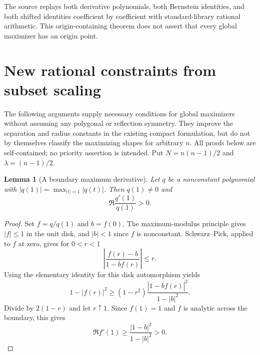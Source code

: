 \documentclass[11pt]{article}
\newtheorem{lemma}[theorem]{Lemma}
\theoremstyle{remark}
\numberwithin{equation}{section}
\begin{document}
The source  replays both derivative
polynomials, both Bernstein identities, and both shifted identities
coefficient by coefficient with standard-library rational arithmetic.
This origin-containing theorem does not assert that every global
maximizer has an origin point.

\section{New rational constraints from subset scaling}
\label{sec:subset-scaling-new}

The following arguments supply necessary conditions for global maximizers
without assuming any polygonal or reflection symmetry. They improve the
separation and radius constants in the existing compact formulation, but
do not by themselves classify the maximizing shapes for arbitrary $n$.
All proofs below are self-contained; no priority assertion is intended.
Put $N=n(n-1)/2$ and $\lambda=(n-1)/2$.

\begin{lemma}[A boundary maximum derivative]\label{lem:boundary-derivative-new}
Let $q$ be a nonconstant polynomial with
$|q(1)|=\max_{|t|=1}|q(t)|$. Then $q(1)\ne0$ and
\[
                 \Re\frac{q'(1)}{q(1)}>0.
\]
\end{lemma}
\begin{proof}
Set $f=q/q(1)$ and $b=f(0)$. The maximum-modulus principle gives
$|f|\le1$ in the unit disk, and $|b|<1$ since $f$ is nonconstant.
Schwarz--Pick, applied to $f$ at zero, gives for $0<r<1$
\[
 \left|\frac{f(r)-b}{1-\overline b f(r)}\right|\le r.
\]
Using the elementary identity for this disk automorphism yields
\[
 1-|f(r)|^2\ge
 (1-r^2)\frac{|1-\overline b f(r)|^2}{1-|b|^2}.
\]
Divide by $2(1-r)$ and let $r\uparrow1$. Since $f(1)=1$ and $f$
is analytic across the boundary, this gives
\[
 \Re f'(1)\ge\frac{|1-b|^2}{1-|b|^2}>0.
\]
\end{proof}
\end{document}
